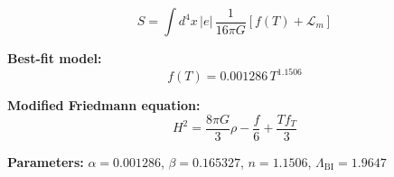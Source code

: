 
\begin{equation}
  S = \int d^4x \, |e| \, \frac{1}{16\pi G} \left[ f(T) + \mathcal{L}_m \right]
\end{equation}

\textbf{Best-fit model:}
\begin{equation}
  f(T) = 0.001286 \, T^{1.1506}
\end{equation}

\textbf{Modified Friedmann equation:}
\begin{equation}
  H^2 = \frac{8\pi G}{3} \rho - \frac{f}{6} + \frac{T f_T}{3}
\end{equation}

\textbf{Parameters:}
$\alpha = 0.001286$, \quad
$\beta = 0.165327$, \quad
$n = 1.1506$, \quad
$\Lambda_{\text{BI}} = 1.9647$